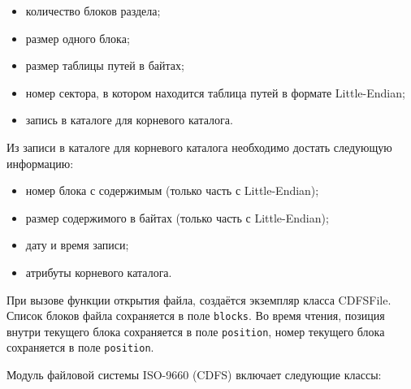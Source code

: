 \begin{itemize}
\item количество блоков раздела;
\item размер одного блока;
\item размер таблицы путей в байтах;
\item номер сектора, в котором находится таблица путей в формате Little-Endian;
\item запись в каталоге для корневого каталога.
\end{itemize}

Из записи в каталоге для корневого каталога необходимо достать следующую информацию:
\begin{itemize}
\item номер блока с содержимым (только часть с Little-Endian);
\item размер содержимого в байтах (только часть с Little-Endian);
\item дату и время записи;
\item атрибуты корневого каталога.
\end{itemize}

При вызове функции открытия файла, создаётся экземпляр класса CDFSFile. Список блоков файла сохраняется в поле \texttt{blocks}. Во время чтения, позиция внутри текущего блока сохраняется в поле \texttt{position}, номер текущего блока сохраняется в поле \texttt{position}.

Модуль файловой системы ISO-9660 (CDFS) включает следующие классы:


